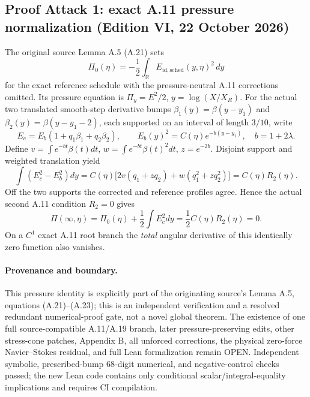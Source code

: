 \subsection*{Proof Attack 1: exact A.11 pressure normalization (Edition VI, 22 October 2026)}
\label{subsec:a11-pressure-editionVI}
The original source Lemma A.5 (A.21) sets
\[
\Pi_0(\eta)=-\frac12\int_{\mathbb R}E_{\mathrm{id,sched}}(y,\eta)^2\,dy
\]
for the exact reference schedule with the pressure-neutral A.11
corrections omitted. Its pressure equation is
$\Pi_y=E^2/2$, $y=\log(X/X_R)$.
For the actual two translated smooth-step derivative bumps
$\beta_1(y)=\beta(y-y_1)$ and
$\beta_2(y)=\beta(y-y_1-2)$, each supported
on an interval of length $3/10$, write
\[
E_c=E_b(1+q_1\beta_1+q_2\beta_2),\qquad
E_b(y)^2=C(\eta)e^{-b(y-y_1)},\quad b=1+2\lambda.
\]
Define $v=\int e^{-bt}\beta(t)dt$,
$w=\int e^{-bt}\beta(t)^2dt$, $z=e^{-2b}$.
Disjoint support and weighted translation yield
\begin{equation}\label{eq:editionVI-pressure-factor}
\int(E_c^2-E_b^2)dy
=C(\eta)\bigl[2v(q_1+zq_2)+w(q_1^2+zq_2^2)\bigr]
=C(\eta)R_2(\eta).
\end{equation}
Off the two supports the corrected and reference profiles agree.
Hence the actual second A.11 condition $R_2=0$ gives
\begin{equation}\label{eq:editionVI-pressure-zero}
\boxed{\Pi(\infty,\eta)=\Pi_0(\eta)+\frac12
\int E_c^2dy=\frac12 C(\eta)R_2(\eta)=0.}
\end{equation}
On a $C^1$ exact A.11 root branch the \emph{total}
angular derivative of this identically zero function also vanishes.

\paragraph{Provenance and boundary.}
This pressure identity is explicitly part of the originating
source's Lemma A.5, equations (A.21)--(A.23); this is
an independent verification and a resolved redundant
numerical-proof gate, not a novel global theorem.
The existence of one full source-compatible A.11/A.19 branch,
later pressure-preserving edits, other stress-cone patches,
Appendix B, all unforced corrections, the physical zero-force
Navier--Stokes residual, and full Lean formalization remain OPEN.
Independent symbolic, prescribed-bump 68-digit numerical,
and negative-control checks passed; the new Lean code
contains only conditional scalar/integral-equality implications
and requires CI compilation.